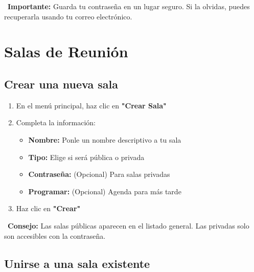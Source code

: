 \documentclass[11pt,a4paper]{article}
\begin{document}
\begin{warningbox}
    \faExclamationTriangle\ \textbf{Importante:} Guarda tu contraseña en un lugar seguro. Si la olvidas, puedes recuperarla usando tu correo electrónico.
\end{warningbox}

\section{Salas de Reunión \faDoorOpen}

\subsection{Crear una nueva sala}

\begin{enumerate}[leftmargin=2cm]
    \item En el menú principal, haz clic en \textcolor{charlatonBlue}{\textbf{"Crear Sala"}}
    \item Completa la información:
    \begin{itemize}
        \item \textbf{Nombre:} Ponle un nombre descriptivo a tu sala
        \item \textbf{Tipo:} Elige si será pública o privada
        \item \textbf{Contraseña:} (Opcional) Para salas privadas
        \item \textbf{Programar:} (Opcional) Agenda para más tarde
    \end{itemize}
    \item Haz clic en \textcolor{charlatonBlue}{\textbf{"Crear"}}
\end{enumerate}

\begin{tipbox}
    \faLightbulb\ \textbf{Consejo:} Las salas públicas aparecen en el listado general. Las privadas solo son accesibles con la contraseña.
\end{tipbox}

\subsection{Unirse a una sala existente}
\end{document}
